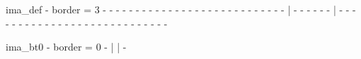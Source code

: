 ima_def - border = 3
- - - - - - - -
- - - - - - - -
- - - - - - - -
- - - - | - - -
- - - | - - - -
- - - - - - - -
- - - - - - - -
- - - - - - - -

ima_bt0 - border = 0
- |
| -
